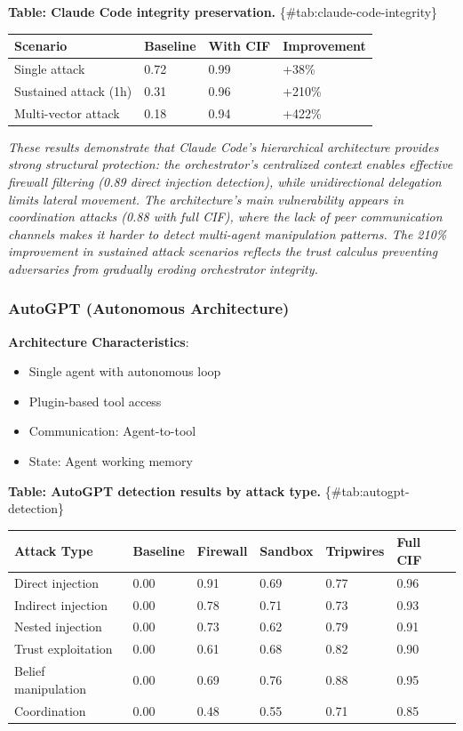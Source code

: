 \documentclass[
]{article}
\newcounter{none} %
\begin{document}
\textbf{Table: Claude Code integrity preservation.}
\{\#tab:claude-code-integrity\}

{\def\LTcaptype{none} %
\begin{longtable}[]{@{}llll@{}}
\toprule\noalign{}
Scenario & Baseline & With CIF & Improvement \\
\midrule\noalign{}
\endhead
\bottomrule\noalign{}
\endlastfoot
Single attack & 0.72 & 0.99 & +38\% \\
Sustained attack (1h) & 0.31 & 0.96 & +210\% \\
Multi-vector attack & 0.18 & 0.94 & +422\% \\
\end{longtable}
}

\emph{These results demonstrate that Claude Code's hierarchical
architecture provides strong structural protection: the orchestrator's
centralized context enables effective firewall filtering (0.89 direct
injection detection), while unidirectional delegation limits lateral
movement. The architecture's main vulnerability appears in coordination
attacks (0.88 with full CIF), where the lack of peer communication
channels makes it harder to detect multi-agent manipulation patterns.
The 210\% improvement in sustained attack scenarios reflects the trust
calculus preventing adversaries from gradually eroding orchestrator
integrity.}

\subsubsection{AutoGPT (Autonomous Architecture)}\label{sec:autogpt}

\textbf{Architecture Characteristics}:

\begin{itemize}
\item Single agent with autonomous loop
\item Plugin-based tool access
\item Communication: Agent-to-tool
\item State: Agent working memory
\end{itemize}

\textbf{Table: AutoGPT detection results by attack type.}
\{\#tab:autogpt-detection\}

{\def\LTcaptype{none} %
\begin{longtable}[]{@{}llllll@{}}
\toprule\noalign{}
Attack Type & Baseline & Firewall & Sandbox & Tripwires & Full CIF \\
\midrule\noalign{}
\endhead
\bottomrule\noalign{}
\endlastfoot
Direct injection & 0.00 & 0.91 & 0.69 & 0.77 & 0.96 \\
Indirect injection & 0.00 & 0.78 & 0.71 & 0.73 & 0.93 \\
Nested injection & 0.00 & 0.73 & 0.62 & 0.79 & 0.91 \\
Trust exploitation & 0.00 & 0.61 & 0.68 & 0.82 & 0.90 \\
Belief manipulation & 0.00 & 0.69 & 0.76 & 0.88 & 0.95 \\
Coordination & 0.00 & 0.48 & 0.55 & 0.71 & 0.85 \\
\end{longtable}
}
\end{document}
